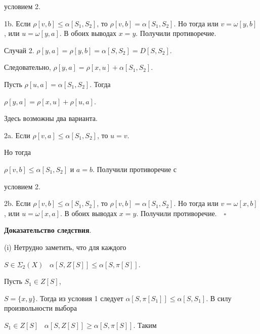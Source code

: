 условием 2.





1b. Если $\rho [v,b] \leq  \alpha [S_{1},S_{2}]$, то $\rho [v,b] =


\alpha [S_{1},S_{2}]$. Но тогда или $v = \omega [y,b]$, или $u =


\omega [y,a]$. В обоих выводах $x = y$. Получили противоречие.





Случай 2. $\rho [y,a] = \rho [y,b] = \alpha [S,S_{2}] = D[S,S_{2}]$.


Следовательно, $\rho [y,a] = \rho [x,u] + \alpha [S_{1},S_{2}]$.


Пусть $\rho [u,a] = \alpha [S_{1},S_{2}]$. Тогда


$\rho [y,a] = \rho [x,u] +  \rho [u,a]$.


Здесь возможны два варианта.





2a. Если $\rho [v,a] \leq  \alpha [S_{1},S_{2}]$, то $u = v$.


Но тогда


$\rho [v,b] \leq  \alpha [S_{1},S_{2}]$ и $a = b$. Получили противоречие с


условием 2.





2b.  Если $\rho [v,b] \leq  \alpha [S_{1},S_{2}]$, то $\rho [v,b]


= \alpha [S_{1},S_{2}]$. Но тогда или $v = \omega [x,b]$, или $u =


\omega [x,a]$. В обоих выводах $x = y$. Получили противоречие.$\quad\square$


\medskip





{\bf Доказательство следствия}.





(i) Нетрудно заметить, что для каждого


$S \in \Sigma_{2} (X)$ \ $\alpha [S,Z[S]] \leq \alpha [S,\pi [S]]$.


Пусть $S_{1} \in Z[S]$,


$S = \{x, y\}$. Тогда из условия 1 следует $\alpha [S,\pi


[S_{1}]] \leq \alpha [S,S_{1}]$. В силу произвольности выбора


$S_{1} \in Z[S]$ \ $\alpha [S,Z[S]] \geq \alpha [S,\pi[S]]$. Таким


